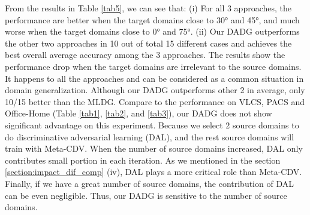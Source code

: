 \documentclass[twocolumn,preprint]{elsarticle}
\begin{document}
From the results in Table \ref{tab5}, we can see that:
(i) For all 3 approaches, the performance are better when the target domains close to \ang{30} and \ang{45}, and much worse when the target domains close to \ang{0} and \ang{75}. 
(ii) Our DADG outperforms the other two approaches in 10 out of total 15 different cases and achieves the best overall average accuracy among the 3 approaches. 
The results show the performance drop when the target domains are irrelevant to the source domains. It happens to all the approaches and can be considered as a common situation in domain generalization.
Although our DADG outperforms other 2 in average, only 10/15 better than the MLDG. Compare to the performance on VLCS, PACS and Office-Home (Table \ref{tab1}, \ref{tab2}, and \ref{tab3}), our DADG does not show significant advantage on this experiment. 
Because we select 2 source domains to do discriminative adversarial learning (DAL), and the rest source domains will train with Meta-CDV. When the number of source domains increased, DAL only contributes small portion in each iteration. As we mentioned in the section \ref{section:impact_dif_comp} (iv), DAL plays a more critical role than Meta-CDV. Finally, if we have a great number of source domains, the contribution of DAL can be even negligible. Thus, our DADG is sensitive to the number of source domains.
\end{document}
